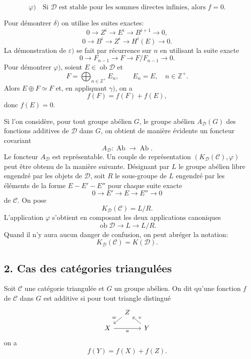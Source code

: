 \documentclass[11pt]{article}
\providecommand{\Ob}{\operatorname{ob}}
\providecommand{\cC}{\mathcal C}
\providecommand{\Ob}{\operatorname{ob}}
\providecommand{\Ab}{\operatorname{Ab}}
\providecommand{\cC}{\mathcal C}
\providecommand{\cD}{\mathcal D}
\providecommand{\Ab}{\operatorname{Ab}}
\providecommand{\Ob}{\operatorname{Ob}}
\providecommand{\Ob}{\operatorname{ob}}
\providecommand{\Ob}{\operatorname{Ob}}
\begin{document}
\[
\varphi)\quad
\text{Si }\cD\text{ est stable pour les sommes directes infinies, alors }f=0.
\]

Pour démontrer $\delta)$ on utilise les suites exactes:
\[
0\longrightarrow Z^i\longrightarrow E^i\longrightarrow B^{i+1}\longrightarrow 0,
\]
\[
0\longrightarrow B^i\longrightarrow Z^i\longrightarrow H^i(E)\longrightarrow 0.
\]
La démonstration de $\varepsilon)$ se fait par récurrence sur $n$ en utilisant la suite exacte
\[
0\longrightarrow F_{n-1}\longrightarrow F\longrightarrow F/F_{n-1}\longrightarrow 0.
\]
Pour démontrer $\varphi)$, soient $E\in\Ob\cD$ et
\[
F=\bigoplus_{n\in\mathbb Z^+}E_n,\qquad E_n=E,\quad n\in\mathbb Z^+.
\]
Alors $E\oplus F\simeq F$ et, en appliquant $\gamma)$, on a
\[
f(F)=f(F)+f(E),
\]
donc $f(E)=0$.

Si l'on considère, pour tout groupe abélien $G$, le groupe abélien $A_{\cD}(G)$ des fonctions additives de $\cD$ dans $G$, on obtient de manière évidente un foncteur covariant
\[
A_{\cD}:\Ab\longrightarrow\Ab.
\]
Le foncteur $A_{\cD}$ est représentable. Un couple de représentation $(K_{\cD}(\cC),\varphi)$ peut être obtenu de la manière suivante. Désignant par $L$ le groupe abélien libre engendré par les objets de $\cD$, soit $R$ le sous-groupe de $L$ engendré par les éléments de la forme $E-E'-E''$ pour chaque suite exacte
\[
0\longrightarrow E'\longrightarrow E\longrightarrow E''\longrightarrow 0
\]
de $\cC$. On pose
\[
K_{\cD}(\cC)=L/R.
\]
L'application $\varphi$ s'obtient en composant les deux applications canoniques
\[
\Ob\cD\longrightarrow L\longrightarrow L/R.
\]
Quand il n'y aura aucun danger de confusion, on peut abréger la notation:
\[
K_{\cD}(\cC)=K(\cD).
\]

\subsection*{2. Cas des catégories triangulées}

Soit $\cC$ une catégorie triangulée et $G$ un groupe abélien. On dit qu'une fonction $f$ de $\cC$ dans $G$ est additive si pour tout triangle distingué
\[
\begin{tikzcd}[column sep=small,row sep=small]
& Z \arrow[dl,"w"']\\
X \arrow[rr,"u"'] && Y \arrow[ul,"v"']
\end{tikzcd}
\]
on a
\[
f(Y)=f(X)+f(Z).
\]
\end{document}
